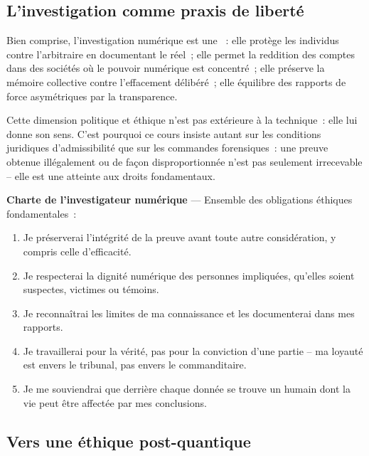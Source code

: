 \subsection{L'investigation comme praxis de liberté}

Bien comprise, l'investigation numérique est une ~: elle protège les individus contre
l'arbitraire en documentant le réel~; elle permet la reddition des comptes
dans des sociétés où le pouvoir numérique est concentré~; elle préserve
la mémoire collective contre l'effacement délibéré~; elle équilibre des
rapports de force asymétriques par la transparence.

\medskip

Cette dimension politique et éthique n'est pas extérieure à la technique~:
elle lui donne son sens. C'est pourquoi ce cours insiste autant sur les
conditions juridiques d'admissibilité que sur les commandes forensiques~:
une preuve obtenue illégalement ou de façon disproportionnée n'est pas
seulement irrecevable -- elle est une atteinte aux droits fondamentaux.

\begin{boxdef}
\textbf{Charte de l'investigateur numérique}
--- Ensemble des obligations éthiques fondamentales~:

\begin{enumerate}
    \item Je préserverai l'intégrité de la preuve avant toute autre
          considération, y compris celle d'efficacité.
    \item Je respecterai la dignité numérique des personnes impliquées,
          qu'elles soient suspectes, victimes ou témoins.
    \item Je reconnaîtrai les limites de ma connaissance et les documenterai
          dans mes rapports.
    \item Je travaillerai pour la vérité, pas pour la conviction d'une
          partie -- ma loyauté est envers le tribunal, pas envers
          le commanditaire.
    \item Je me souviendrai que derrière chaque donnée se trouve un humain
          dont la vie peut être affectée par mes conclusions.
\end{enumerate}
\end{boxdef}

\subsection{Vers une éthique post-quantique}

